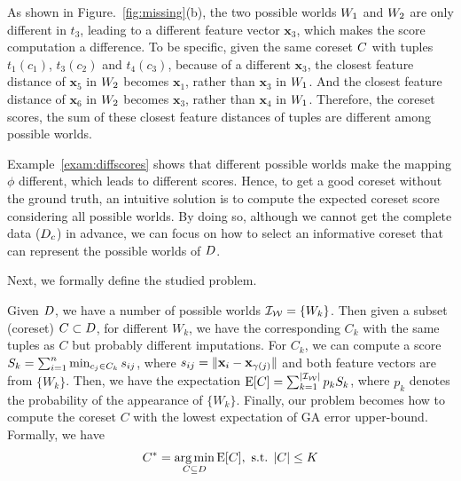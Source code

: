 \begin{example}
\label{exam:diffscores}
	As shown in Figure.~\ref{fig:missing}(b), the two possible worlds $W_1$ and $W_2$ are only different in $t_3$, leading to a different feature vector $\mathbf{x}_3$, which makes the score computation a difference. To be specific, given the same coreset $C$ with tuples $t_1 (c_1)$, $t_3 (c_2)$ and $t_4 (c_3)$, because of a different $\mathbf{x}_3$, the closest feature distance of $\mathbf{x}_5$ in $W_2$ becomes $\mathbf{x}_1$, rather than $\mathbf{x}_3$ in $W_1$. And the closest feature distance of $\mathbf{x}_6$ in $W_2$ becomes $\mathbf{x}_3$, rather than $\mathbf{x}_4$ in $W_1$. Therefore, the coreset scores, %
	\ie the sum of these closest feature distances of tuples are different among possible worlds.
	\vspace{-0.3em}
\end{example}

Example~\ref{exam:diffscores} shows that different possible worlds make the mapping $\phi$ different, which leads to different scores. Hence, to get a good coreset without the ground truth, an intuitive solution is to compute the expected coreset score considering all possible worlds. By doing so, although we cannot get the complete data ($D_c$) in advance, we can focus on how to select an informative coreset that can represent the possible worlds of $D$.

Next, we formally define the studied problem.

	 Given $D$, we have a number of possible worlds $\mathcal{I_W}=\{W_k\}$. Then given a subset (coreset) $C\subset D$,  
	  for different $W_k$, we have the corresponding $C_k$ with the same tuples as $C$ but probably different imputations.
	   For $C_k$, we can compute a score $S_k = \sum_{i=1}^n \min_{c_j\in C_k}s_{ij}$, where $s_{ij} =  \lVert\mathbf{x}_i - \mathbf{x}_{\gamma(j)}\rVert$ and   both feature vectors are from $\{W_k\}$. Then, we have the expectation $\mathrm{E}[C] = \sum_{k= 1}^{|\mathcal{I_W}|} p_kS_k$, where $p_k$ denotes the probability of the appearance of  $\{W_k\}$.
	Finally, our problem becomes how to compute the coreset $C$ with the lowest expectation of GA error upper-bound. Formally, we have
	\begin{equation}\label{eqa:expectation}
	\core^* = \argmin   \limits_{C\subseteq \train}\mathrm{E}[C], \text{ s.t. } |C| \le \numcore %
	\end{equation} 

